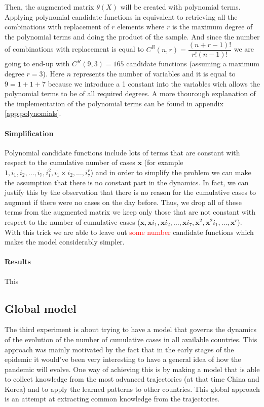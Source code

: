 \documentclass[12pt, letterpaper]{article}
\newcommand{\com}[1]{{\small {\fontfamily{ptm} \selectfont \textcolor{red}{#1}}}}
\begin{document}
Then, the augmented matrix $\theta(X)$ will be created with polynomial terms.
Applying polynomial candidate functions in equivalent to retrieving all the combinations with replacement of $r$ elements where $r$ is the maximum degree of the polynomial terms and doing the product of the sample. 
And since the number of combinations with replacement is equal to $C^R(n,r) = \dfrac{(n + r - 1)!}{ r! (n - 1)! }$ we are going to end-up with $C^R(9, 3) = 165$ candidate functions (assuming a maximum degree $r=3$). 
Here $n$ represents the number of variables and it is equal to $9=1+1+7$ because we introduce a 1 constant into the variables wich allows the polynomial terms to be of all required degrees. 
A more thourough explanation of the implementation of the polynomial terms can be found in appendix \ref{app:polynomials}.

\paragraph{Simplification}
Polynomial candidate functions include lots of terms that are constant with respect to the cumulative number of cases $\mathbf{x}$ (for example $1, i_1, i_2, \dots, i_7, i_1^2, i_1 \times i_2, \dots, i_7^r$) and in order to simplify the problem we can make the assumption that there is no constant part in the dynamics. 
In fact, we can justify this by the observation that there is no reason for the cumulative cases to augment if there were no cases on the day before.
Thus, we drop all of these terms from the augmented matrix we keep only those that are not constant with respect to the number of cumulative cases ($\mathbf{x}, \mathbf{x} i_1, \mathbf{x} i_2, \dots, \mathbf{x} i_7, \mathbf{x}^2, \mathbf{x}^2 i_1, \dots, \mathbf{x}^r$).
With this trick we are able to leave out \com{some number} candidate functions which makes the model considerably simpler.

\paragraph{Results} 

This 

\subsection{Global model}\label{sec:global}

The third experiment is about trying to have a model that governs the dynamics of the evolution of the number of cumulative cases in all available countries.
This approach was mainly motivated by the fact that in the early stages of the epidemic it would've been very interesting to have a general idea of how the pandemic will evolve.
One way of achieving this is by making a model that is able to collect knowledge from the most advanced trajectories (at that time China and Korea) and to apply the learned patterns to other countries.
This global approach is an attempt at extracting common knowledge from the trajectories.
\end{document}
